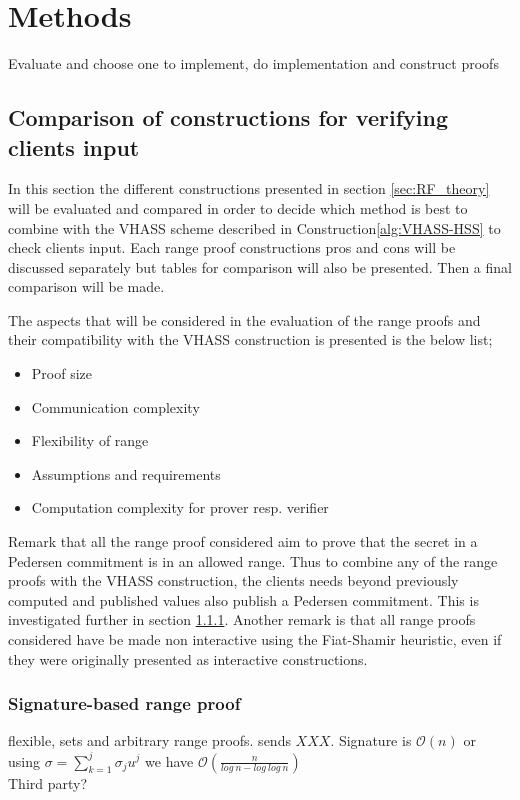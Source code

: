 \chapter{Methods}
\label{sec:Methods}

Evaluate and choose one to implement, do implementation and construct proofs
\section{Comparison of constructions for verifying clients input}
In this section the different constructions presented in section \ref{sec:RF_theory} will be evaluated and compared in order to decide which method is best to combine with the VHASS scheme described in Construction\ref{alg:VHASS-HSS} to check clients input. Each range proof constructions pros and cons will be discussed separately but tables for comparison will also be presented. Then a final comparison will be made.

The aspects that will be considered in the evaluation of the range proofs and their compatibility with the VHASS construction is presented is the below list;
\begin{itemize}
    \item Proof size
    \item Communication complexity
    \item Flexibility of range
    \item Assumptions and requirements 
    \item Computation complexity for prover resp. verifier
\end{itemize}

Remark that all the range proof considered aim to prove that the secret in a Pedersen commitment is in an allowed range. Thus to combine any of the range proofs with the VHASS construction, the clients needs beyond previously computed and published values also publish a Pedersen commitment. This is investigated further in section \ref{}. Another remark is that all range proofs considered have be made non interactive using the Fiat-Shamir heuristic, even if they were originally presented as interactive constructions. 

\subsection{Signature-based range proof}
flexible, sets and arbitrary range proofs. 
sends $XXX$. Signature is $\mathcal{O}(n)$ or using $\sigma=\sum_{k=1}^j\sigma_ju^j$ we have $\mathcal{O}(\frac{n}{log\:n-log\:log\:n})$\\
Third party?
